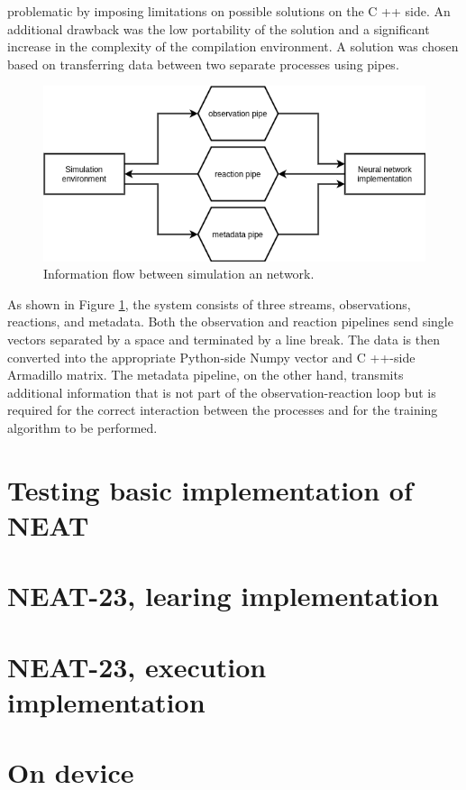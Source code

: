 problematic by imposing limitations on possible solutions on the C ++ side. 
An additional drawback was the low portability of the solution and a significant increase in the 
complexity of the compilation environment. 
A solution was chosen based on transferring data between two separate processes using pipes.
\begin{figure}[htb] 
	\label{fig:experiment_pipes}
	\centering
	\includegraphics[width=\textwidth]{figures/experiment_pipes}
	\caption{Information flow between simulation an network.}
\end{figure}

As shown in Figure \ref{fig:experiment_pipes}, the system consists of three streams, 
observations, reactions, and metadata. 
Both the observation and reaction pipelines send single vectors separated by a space and terminated
by a line break. 
The data is then converted into the appropriate Python-side Numpy vector and C ++-side Armadillo 
matrix. 
The metadata pipeline, on the other hand, transmits additional information that is not part of 
the observation-reaction loop but is required for the correct interaction between the processes 
and for the training algorithm to be performed.

\FloatBarrier
\section{Testing basic implementation of NEAT}

\FloatBarrier
\section{NEAT-23, learing implementation}

\FloatBarrier
\section{NEAT-23, execution implementation}

\FloatBarrier
\section{On device}

